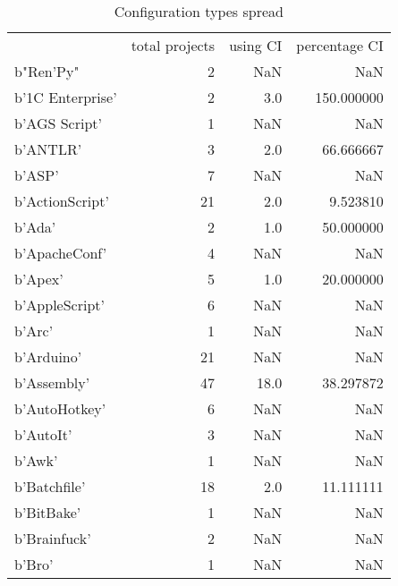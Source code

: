 \begin{table}
\centering
\caption{Configuration types spread}
\label{table_config_types}
\begin{tabular}{lrrr}
{} &  total projects &  using CI &  percentage CI \\
b"Ren'Py"                   &               2 &       NaN &            NaN \\
b'1C Enterprise'            &               2 &       3.0 &     150.000000 \\
b'AGS Script'               &               1 &       NaN &            NaN \\
b'ANTLR'                    &               3 &       2.0 &      66.666667 \\
b'ASP'                      &               7 &       NaN &            NaN \\
b'ActionScript'             &              21 &       2.0 &       9.523810 \\
b'Ada'                      &               2 &       1.0 &      50.000000 \\
b'ApacheConf'               &               4 &       NaN &            NaN \\
b'Apex'                     &               5 &       1.0 &      20.000000 \\
b'AppleScript'              &               6 &       NaN &            NaN \\
b'Arc'                      &               1 &       NaN &            NaN \\
b'Arduino'                  &              21 &       NaN &            NaN \\
b'Assembly'                 &              47 &      18.0 &      38.297872 \\
b'AutoHotkey'               &               6 &       NaN &            NaN \\
b'AutoIt'                   &               3 &       NaN &            NaN \\
b'Awk'                      &               1 &       NaN &            NaN \\
b'Batchfile'                &              18 &       2.0 &      11.111111 \\
b'BitBake'                  &               1 &       NaN &            NaN \\
b'Brainfuck'                &               2 &       NaN &            NaN \\
b'Bro'                      &               1 &       NaN &            NaN \\

\end{tabular}
\end{table}
